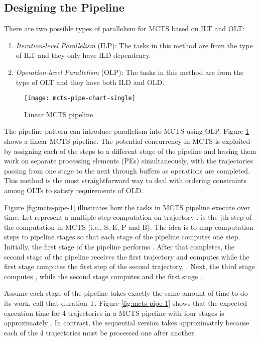 \documentclass[10pt, conference, compsocconf]{IEEEtran}
\begin{document}
\subsection{Designing the Pipeline}
There are two possible types of parallelism for MCTS based on ILT and OLT:
\begin{enumerate}
\item \textit{Iteration-level Parallelism} (ILP): The tasks in this method are from the type of ILT and they only have ILD dependency. 

\item \textit{Operation-level Parallelism }(OLP): The tasks in this method are from the type of OLT and they have both ILD and OLD.

\end{enumerate}
\begin{figure}
\centering
\texttt{[image: mcts-pipe-chart-single]}
\caption{Linear MCTS pipeline.}
\label{fig:mcts-pipe}
\end{figure}

The pipeline pattern can introduce parallelism into MCTS using OLP. Figure \ref{fig:mcts-pipe} shows a linear MCTS pipeline. The potential concurrency in MCTS is exploited by assigning each of the steps to a different stage of the pipeline and having them work on separate processing elements (PEs) simultaneously, with the trajectories passing from one stage to the next through buffers as operations are completed. This method is the most straightforward way to deal with ordering constraints among OLTs to satisfy requirements of OLD.



Figure \ref{fig:mcts-pipe-1} illustrates how the tasks in MCTS pipeline execute over time. Let  represent a multiple-step computation on trajectory .  is the jth step of the computation in MCTS (i.e.,  S, E, P and B). The idea is to map computation steps to pipeline stages so that each stage of the pipeline computes one step. Initially, the first stage of the pipeline performs . After that completes, the second stage of the pipeline receives the first trajectory and computes  while the first stage computes the first step of the second trajectory, . Next, the third stage computes , while the second stage computes  and the first stage . 

Assume each stage of the pipeline takes exactly the same amount of time to do its work, call that duration T. Figure \ref{fig:mcts-pipe-1} shows that the expected execution time for 4 trajectories in a MCTS pipeline with four stages is approximately . In contrast, the sequential version takes approximately  because each of the 4 trajectories must be processed one after another.
\end{document}
